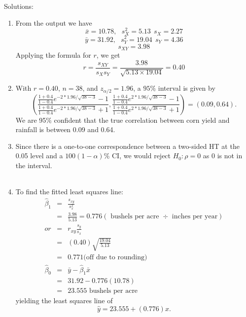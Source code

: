 \documentclass{report}
\begin{document}
\newpage

Solutions:
\begin{enumerate}
\item From the output we have
$$ \bar{x}=10.78, \ \ \ s^2_X=5.13 \ \ s_X = 2.27$$
$$ \bar{y}=31.92, \ \ \ s^2_Y=19.04 \ \ s_Y = 4.36$$ 
$$ s_{XY}=3.98$$
Applying the formula for $r$, we get
$$ r=\frac{s_{XY}}{s_X s_Y}=\frac{3.98}{\sqrt{5.13 \times 19.04}} =0.40$$

\item With $r=0.40$, $n=38$, and $z_{\alpha/2}=1.96$, a $95\%$ interval is given by
$$ \left(\frac{\frac{1+0.4}{1-0.4}e^{-2*1.96/\sqrt{38-3}}-1}{\frac{1+0.4}{1-0.4}e^{-2*1.96/\sqrt{38-3}}+1}, \frac{\frac{1+0.4}{1-0.4}e^{2*1.96/\sqrt{38-3}}-1}{\frac{1+0.4}{1-0.4}e^{2*1.96/\sqrt{38-3}}+1}\right)=(0.09,0.64).$$
We are 95\% confident that the true correlation between corn yield and rainfall is between 0.09 and 0.64.
\item Since there is a one-to-one correspondence between a two-sided HT at the 0.05 level and a $100(1-\alpha)$\% CI, we would reject $H_0:\rho=0$ as 0 is not in the interval.\\~\\

\item To find the fitted least squares line:
\begin{eqnarray*}\hat{\beta}_1 &=& \frac{s_{xy}}{s_x^2} \\
&=& \frac{3.98}{5.13} =0.776 (\mbox{ bushels per acre }\div \mbox{ inches per year})\\
or &=& r_{xy}\frac{s_y}{s_x} \\
&=& (0.40) \sqrt{\frac{19.04}{5.13}}\\
&=& 0.771 \mbox{(off due to rounding)}\\
\hat{\beta}_0 &=& \bar{y}-\hat\beta_1 \bar{x}\\
&=& 31.92- 0.776 (10.78) \\
&=& 23.555 \mbox{ bushels per acre } 
\end{eqnarray*}
yielding the least squares line of
$$ \hat{y}=23.555 + (0.776) x. $$


\end{enumerate}
\end{document}
